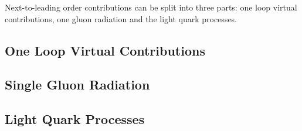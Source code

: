 Next-to-leading order contributions can be split into three parts: one loop virtual contributions, one gluon radiation and the light quark processes.

\subsection{One Loop Virtual Contributions}


\subsection{Single Gluon Radiation}


\subsection{Light Quark Processes}

